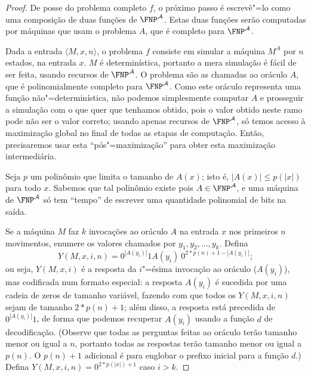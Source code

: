 \begin{proof}
    De posse do problema completo $f$,
    o próximo passo é escrevê"=lo como uma composição
    de duas funções de $\FNP^\mathcal A$.
    Estas duas funções serão computadas por máquinas
    que usam o problema $A$,
    que é completo para $\FNP^\mathcal A$.

    Dada a entrada $\langle M, x, n \rangle$,
    o problema $f$ consiste em simular a máquina $M^A$ por $n$ estados,
    na entrada $x$.
    $M$ é determinística, portanto a mera simulação é fácil de ser feita,
    usando recursos de $\FNP^\mathcal A$.
    O problema são as chamadas ao oráculo $A$,
    que é polinomialmente completo para $\FNP^\mathcal A$.
    Como este oráculo representa uma função não"=determinística,
    não podemos simplesmente computar $A$
    e prosseguir a simulação com o que quer que tenhamos obtido,
    pois o valor obtido neste ramo
    pode não ser o valor correto;
    usando apenas recursos de $\FNP^\mathcal A$,
    só temos acesso à maximização global
    no final de todas as etapas de computação.
    Então, precisaremos usar esta ``pós"=maximização''
    para obter esta maximização intermediária.

    Seja $p$ um polinômio que limita o tamanho de $A(x)$;
    isto é, $|A(x)| \leq p(|x|)$ para todo $x$.
    Sabemos que tal polinômio existe
    pois $A \in \FNP^\mathcal A$,
    e uma máquina de $\FNP^\mathcal A$ só tem ``tempo''
    de escrever uma quantidade polinomial de bits na saída.

    Se a máquina $M$ faz $k$ invocações ao oráculo $A$ na entrada $x$
    nos primeiros $n$ movimentos,
    enumere os valores chamados por $y_1, y_2, \dots, y_k$.
    Defina
    \begin{equation*}
        Y(M, x, i, n) = 0^{|A(y_i)|} 1 A(y_i)\ 0^{2*p(n)+1 - |A(y_i)|};
    \end{equation*}
    ou seja, $Y(M, x, i)$ é a resposta da $i$"=ésima invocação ao oráculo ($A(y_i)$),
    mas codificada num formato especial:
    a resposta $A(y_i)$ é sucedida por uma cadeia de zeros de tamanho variável,
    fazendo com que todos os $Y(M, x, i, n)$ sejam de tamanho $2*p(n) + 1$;
    além disso, a resposta está precedida de $0^{|A(y_i)|}1$,
    de forma que podemos recuperar $A(y_i)$
    usando a função $d$ de decodificação.
    (Observe que todas as perguntas feitas ao oráculo
    terão tamanho menor ou igual a $n$,
    portanto todas as respostas terão tamanho menor ou igual a $p(n)$.
    O $p(n)+1$ adicional é para englobar o prefixo inicial para a função $d$.)
    Defina $Y(M, x, i, n) = 0^{2*p(|x|)+1}$ caso $i > k$.


\end{proof}
